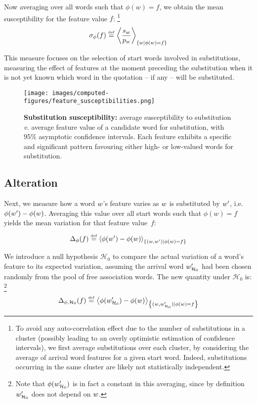 Now averaging over all words such that $\phi(w) = f$, we obtain the mean susceptibility for the feature value $f$:
\footnote{To avoid any auto-correlation effect due to the number of substitutions in a cluster (possibly leading to an overly optimistic estimation of confidence intervals), we first average substitutions over each cluster, by considering the average of arrival word features for a given start word.
Indeed, substitutions occurring in the same cluster are likely not statistically independent.}
$$\sigma_{\phi}(f) \overset{\underset{\mathrm{def}}{}}{=} \left< \frac{s_w}{p_w} \right>_{\left\lbrace w | \phi(w) = f \right\rbrace}$$

This measure focuses on the selection of start words involved in substitutions, measuring the effect of features at the moment preceding the substitution when it is not yet known which word in the quotation -- if any -- will be substituted.

\begin{figure*}[!th]
    \centering
    \texttt{[image: images/computed-figures/feature\_susceptibilities.png]}
    \caption{\textbf{Substitution susceptibility:} average susceptibility to substitution \emph{v.} average feature value of a candidate word for substitution, with 95\% asymptotic confidence intervals.
    Each feature exhibits a specific and significant pattern favouring either high- or low-valued words for substitution.}
    \label{fig:feature-susceptibilities}
\end{figure*}


\subsection{Alteration}

Next, we measure how a word $w$'s feature varies as $w$ is substituted by $w'$, i.e. $\phi(w') - \phi(w)$.
Averaging this value over all start words such that $\phi(w) = f$ yields the mean variation for that feature value~$f$:
$$\Delta_{\phi}(f) \overset{\underset{\mathrm{def}}{}}{=} \left< \phi(w') - \phi(w) \right>_{\left\lbrace (w,w') | \phi(w) = f \right\rbrace}$$

We introduce a null hypothesis $\mathcal{H}_0$ to compare the actual variation of a word's feature to its expected variation, assuming the arrival word $w'_{\mathcal{H}_0}$ had been chosen randomly from the pool of free association words.
The new quantity under $\mathcal{H}_0$ is:
\footnote{Note that $\phi(w'_{\mathcal{H}_0})$ is in fact a constant in this averaging, since by definition $w'_{\mathcal{H}_0}$ does not depend on $w$.}
$$\Delta_{\phi, \mathcal{H}_0}(f) \overset{\underset{\mathrm{def}}{}}{=} \left< \phi({w'_{\mathcal{H}_0}}) - \phi(w) \right>_{\left\lbrace (w,w'_{\mathcal{H}_0}) | \phi(w) = f \right\rbrace}$$

